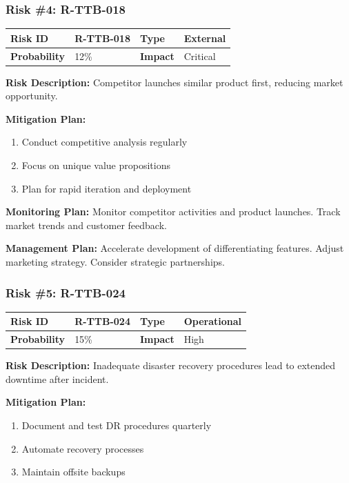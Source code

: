\subsubsection{Risk \#4: R-TTB-018}

\begin{table}[h]
\small
\begin{tabular}{|p{3cm}|p{3cm}|p{3cm}|p{3cm}|}
\hline
\textbf{Risk ID} & R-TTB-018 & \textbf{Type} & External \\
\hline
\textbf{Probability} & 12\% & \textbf{Impact} & Critical \\
\hline
\end{tabular}
\end{table}

\textbf{Risk Description:} Competitor launches similar product first, reducing market opportunity.

\textbf{Mitigation Plan:}
\begin{enumerate}[leftmargin=*]
    \item Conduct competitive analysis regularly
    \item Focus on unique value propositions
    \item Plan for rapid iteration and deployment
\end{enumerate}

\textbf{Monitoring Plan:} Monitor competitor activities and product launches. Track market trends and customer feedback.

\textbf{Management Plan:} Accelerate development of differentiating features. Adjust marketing strategy. Consider strategic partnerships.

\subsubsection{Risk \#5: R-TTB-024}

\begin{table}[h]
\small
\begin{tabular}{|p{3cm}|p{3cm}|p{3cm}|p{3cm}|}
\hline
\textbf{Risk ID} & R-TTB-024 & \textbf{Type} & Operational \\
\hline
\textbf{Probability} & 15\% & \textbf{Impact} & High \\
\hline
\end{tabular}
\end{table}

\textbf{Risk Description:} Inadequate disaster recovery procedures lead to extended downtime after incident.

\textbf{Mitigation Plan:}
\begin{enumerate}[leftmargin=*]
    \item Document and test DR procedures quarterly
    \item Automate recovery processes
    \item Maintain offsite backups
\end{enumerate}

